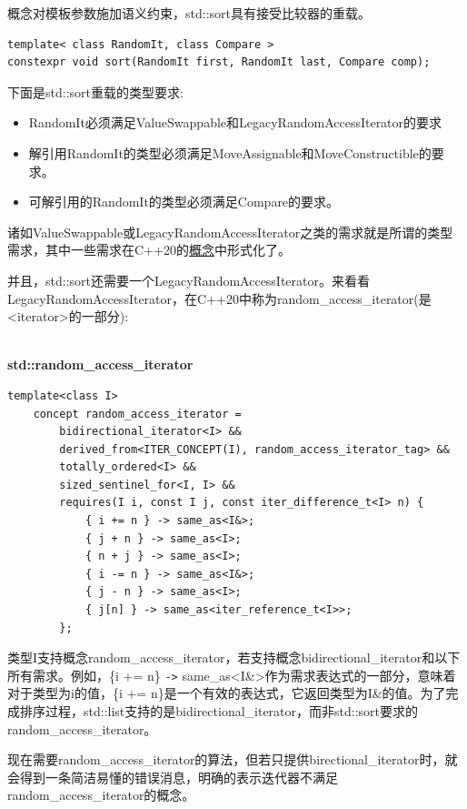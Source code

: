 概念对模板参数施加语义约束，std::sort具有接受比较器的重载。

\begin{lstlisting}[style=styleCXX]
template< class RandomIt, class Compare >
constexpr void sort(RandomIt first, RandomIt last, Compare comp);
\end{lstlisting}

下面是std::sort重载的类型要求:

\begin{itemize}
\item 
RandomIt必须满足ValueSwappable和LegacyRandomAccessIterator的要求

\item 
解引用RandomIt的类型必须满足MoveAssignable和MoveConstructible的要求。

\item 
可解引用的RandomIt的类型必须满足Compare的要求。
\end{itemize}

诸如ValueSwappable或LegacyRandomAccessIterator之类的需求就是所谓的类型需求，其中一些需求在C++20的\href{https://en.cppreference.com/w/cpp/language/constraints}{概念}中形式化了。

并且，std::sort还需要一个LegacyRandomAccessIterator。来看看LegacyRandomAccessIterator，在C++20中称为random\_access\_iterator(是<iterator>的一部分):

\hspace*{\fill} \\ %
\noindent
\textbf{std::random\_access\_iterator}
\begin{lstlisting}[style=styleCXX]
template<class I>
	concept random_access_iterator =
		bidirectional_iterator<I> &&
		derived_from<ITER_CONCEPT(I), random_access_iterator_tag> &&
		totally_ordered<I> &&
		sized_sentinel_for<I, I> &&
		requires(I i, const I j, const iter_difference_t<I> n) {
			{ i += n } -> same_as<I&>;
			{ j + n } -> same_as<I>;
			{ n + j } -> same_as<I>;
			{ i -= n } -> same_as<I&>;
			{ j - n } -> same_as<I>;
			{ j[n] } -> same_as<iter_reference_t<I>>;
		};
\end{lstlisting}

类型I支持概念random\_access\_iterator，若支持概念bidirectional\_iterator和以下所有需求。例如，\{i += n\} \texttt{->} same\_as<I\&>作为需求表达式的一部分，意味着对于类型为i的值，\{i += n\}是一个有效的表达式，它返回类型为I\&的值。为了完成排序过程，std::list支持的是bidirectional\_iterator，而非std::sort要求的random\_access\_iterator。

现在需要random\_access\_iterator的算法，但若只提供birectional\_iterator时，就会得到一条简洁易懂的错误消息，明确的表示迭代器不满足random\_access\_iterator的概念。


